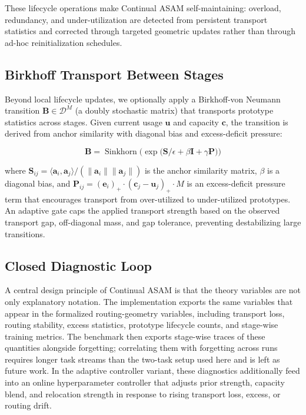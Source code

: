 \documentclass[11pt,a4paper]{article}
\theoremstyle{definition}
\DeclareMathOperator{\Sinkhorn}{Sinkhorn}
\begin{document}
These lifecycle operations make Continual ASAM self-maintaining: overload, redundancy, and under-utilization are detected from persistent transport statistics and corrected through targeted geometric updates rather than through ad-hoc reinitialization schedules.

\subsection{Birkhoff Transport Between Stages}
\label{sec:birkhoff}

Beyond local lifecycle updates, we optionally apply a Birkhoff-von Neumann transition $\mathbf{B} \in \mathcal{D}^M$ (a doubly stochastic matrix) that transports prototype statistics across stages. Given current usage $\mathbf{u}$ and capacity $\mathbf{c}$, the transition is derived from anchor similarity with diagonal bias and excess-deficit pressure:

\begin{equation}
\mathbf{B} = \Sinkhorn\!\Big(\exp\!\big(\mathbf{S}/\epsilon + \beta \mathbf{I} + \gamma \mathbf{P}\big)\Big)
\end{equation}

where $\mathbf{S}_{ij} = \langle \mathbf{a}_i, \mathbf{a}_j \rangle / (\|\mathbf{a}_i\| \|\mathbf{a}_j\|)$ is the anchor similarity matrix, $\beta$ is a diagonal bias, and $\mathbf{P}_{ij} = (\mathbf{e}_i)_+ \cdot (\mathbf{c}_j - \mathbf{u}_j)_+ \cdot M$ is an excess-deficit pressure term that encourages transport from over-utilized to under-utilized prototypes. An adaptive gate caps the applied transport strength based on the observed transport gap, off-diagonal mass, and gap tolerance, preventing destabilizing large transitions.

\subsection{Closed Diagnostic Loop}

A central design principle of Continual ASAM is that the theory variables are not only explanatory notation. The implementation exports the same variables that appear in the formalized routing-geometry variables, including transport loss, routing stability, excess statistics, prototype lifecycle counts, and stage-wise training metrics. The benchmark then exports stage-wise traces of these quantities alongside forgetting; correlating them with forgetting across runs requires longer task streams than the two-task setup used here and is left as future work. In the adaptive controller variant, these diagnostics additionally feed into an online hyperparameter controller that adjusts prior strength, capacity blend, and relocation strength in response to rising transport loss, excess, or routing drift.
\end{document}
